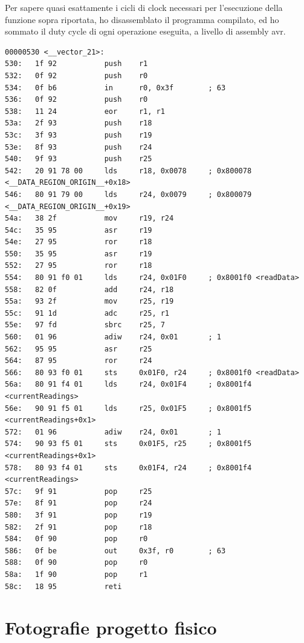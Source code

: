 \documentclass{article}
\begin{document}
Per sapere quasi esattamente i cicli di clock necessari per l'esecuzione della funzione sopra riportata, ho disassemblato il programma compilato, ed ho sommato il duty cycle di ogni operazione eseguita, a livello di assembly avr.
\newpage

\begin{lstlisting}[title=Disassembly della funzione]
00000530 <__vector_21>:
530:   1f 92           push    r1
532:   0f 92           push    r0
534:   0f b6           in      r0, 0x3f        ; 63
536:   0f 92           push    r0
538:   11 24           eor     r1, r1
53a:   2f 93           push    r18
53c:   3f 93           push    r19
53e:   8f 93           push    r24
540:   9f 93           push    r25
542:   20 91 78 00     lds     r18, 0x0078     ; 0x800078 <__DATA_REGION_ORIGIN__+0x18>
546:   80 91 79 00     lds     r24, 0x0079     ; 0x800079 <__DATA_REGION_ORIGIN__+0x19>
54a:   38 2f           mov     r19, r24
54c:   35 95           asr     r19
54e:   27 95           ror     r18
550:   35 95           asr     r19
552:   27 95           ror     r18
554:   80 91 f0 01     lds     r24, 0x01F0     ; 0x8001f0 <readData>
558:   82 0f           add     r24, r18
55a:   93 2f           mov     r25, r19
55c:   91 1d           adc     r25, r1
55e:   97 fd           sbrc    r25, 7
560:   01 96           adiw    r24, 0x01       ; 1
562:   95 95           asr     r25
564:   87 95           ror     r24
566:   80 93 f0 01     sts     0x01F0, r24     ; 0x8001f0 <readData>
56a:   80 91 f4 01     lds     r24, 0x01F4     ; 0x8001f4 <currentReadings>
56e:   90 91 f5 01     lds     r25, 0x01F5     ; 0x8001f5 <currentReadings+0x1>
572:   01 96           adiw    r24, 0x01       ; 1
574:   90 93 f5 01     sts     0x01F5, r25     ; 0x8001f5 <currentReadings+0x1>
578:   80 93 f4 01     sts     0x01F4, r24     ; 0x8001f4 <currentReadings>
57c:   9f 91           pop     r25
57e:   8f 91           pop     r24
580:   3f 91           pop     r19
582:   2f 91           pop     r18
584:   0f 90           pop     r0
586:   0f be           out     0x3f, r0        ; 63
588:   0f 90           pop     r0
58a:   1f 90           pop     r1
58c:   18 95           reti
\end{lstlisting}
\newpage

\section{Fotografie progetto fisico}
\end{document}
